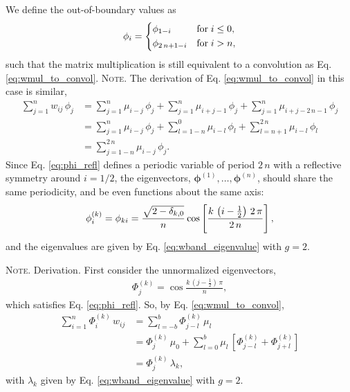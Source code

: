 \documentclass[reprint, superscriptaddress, floatfix]{revtex4-1}
\newcommand{\note}[1]{{\color{DarkGreen}\footnotesize \textsc{Note.} #1}}
\begin{document}
We define the out-of-boundary values as
%
\begin{equation}
  \phi_i
  =
  \begin{dcases}
    \phi_{ 1 - i }           & \mathrm{for \;} i \le 0, \\
    \phi_{ 2 \, n + 1 - i }  & \mathrm{for \;} i > n,
  \end{dcases}
\label{eq:phi_refl}
\end{equation}
%
such that the matrix multiplication is still equivalent to
a convolution as Eq. \eqref{eq:wmul_to_convol}.
%
\note{The derivation of Eq. \eqref{eq:wmul_to_convol}
  in this case is similar,
  \begin{align*}
    \sum_{j = 1}^n w_{ij} \, \phi_j
    &=
    \sum_{j = 1}^n
      \mu_{i - j} \, \phi_j
    +
    \sum_{j = 1}^n
      \mu_{i + j - 1} \, \phi_j
    +
    \sum_{j = 1}^n
      \mu_{i + j - 2 \, n - 1} \, \phi_j
    \\
    &=
    \sum_{j = 1}^n
      \mu_{i - j} \, \phi_j
    +
    \sum_{l = 1 - n}^0
      \mu_{i - l} \, \phi_l
    +
    \sum_{l = n + 1}^{ 2 \, n }
      \mu_{i - l} \, \phi_l
    \\
    &=
    \sum_{j = 1 - n}^{ 2 \, n}
      \mu_{i - j} \, \phi_j.
  \end{align*}
}%
%
Since Eq. \eqref{eq:phi_refl}
defines a periodic variable of period $2 \, n$
with a reflective symmetry around $i = 1/2$,
the eigenvectors,
$\pmb\phi^{(1)}, \dots, \pmb\phi^{(n)}$,
should share the same periodicity,
and be even functions about the same axis:
%
\begin{equation}
  \phi^{(k)}_i
  =
  \phi_{k i}
  =
  \frac{ \sqrt{ 2 - \delta_{k, 0} } }
       {             n              }
  \cos \left[
       \frac{ k \, \left( i - \frac 1 2 \right) \, 2 \, \pi}
            {             2 \, n                           }
       \right]
  ,
\notag
\end{equation}
%
and the eigenvalues are given by
  Eq. \eqref{eq:wband_eigenvalue}
  with $g = 2$.

\note{Derivation.
  First consider the unnormalized eigenvectors,
  \begin{align*}
  \Phi^{(k)}_j
  =
  \cos \frac{ k \, \left( j - \frac 1 2 \right) \, \pi }{n},
  \end{align*}
  which satisfies Eq. \eqref{eq:phi_refl}.
  So, by Eq. \eqref{eq:wmul_to_convol},
  \begin{align*}
  \sum_{i = 1}^n
    \Phi^{(k)}_i \, w_{ij}
  &=
  \sum_{l = -b}^b
    \Phi^{(k)}_{j - l} \, \mu_l
  \\
  &=
    \Phi^{(k)}_j \, \mu_0
  + \sum_{l=0}^{b}
    \mu_l \,
    \left[
      \Phi^{(k)}_{j-l}
      +
      \Phi^{(k)}_{j+l}
    \right]
  \\
  &= \Phi^{(k)}_j \, \lambda_k,
  \end{align*}
  with $\lambda_k$ given by Eq. \eqref{eq:wband_eigenvalue}
  with $g = 2$.
}%
%
\end{document}
